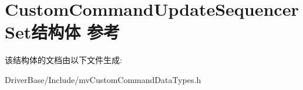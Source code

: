 \hypertarget{struct_custom_command_update_sequencer_set}{\section{Custom\+Command\+Update\+Sequencer\+Set结构体 参考}
\label{struct_custom_command_update_sequencer_set}
}


该结构体的文档由以下文件生成\+:\begin{DoxyCompactItemize}
\item 
Driver\+Base/\+Include/mv\+Custom\+Command\+Data\+Types.\+h\end{DoxyCompactItemize}
